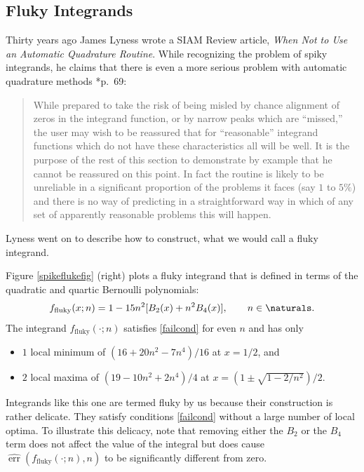 \documentclass[]{amsart}
\DeclareMathOperator{\err}{err}
\newcommand{\herr}{\widehat{\err}}
\theoremstyle{definition}
\theoremstyle{remark}
\begin{document}
\subsection{Fluky Integrands} 

Thirty years ago James Lyness wrote a SIAM Review article, \emph{When Not to Use an Automatic Quadrature Routine}.  While recognizing the problem of spiky integrands, he claims that there is even a more serious problem with automatic quadrature methods   \cite{Lyn83}*{p.\ 69}:
\begin{quote}
While prepared to take the risk of being misled by chance alignment of zeros in the integrand function, or by narrow peaks which are ``missed,'' the user may wish to be reassured that for ``reasonable'' integrand functions which do not have these characteristics all will be well. It is the purpose of the rest of this section to demonstrate by example that he cannot be reassured on this point. In fact the routine is likely to be unreliable in a significant proportion of the problems it faces (say $1$ to $5\%$) and there is no way of predicting in a straightforward way in which of any set of apparently reasonable problems this will happen.
\end{quote}
Lyness went on to describe how to construct, what we would call a fluky integrand.  

Figure \ref{spikeflukefig} (right) plots a fluky integrand that is defined in terms of the quadratic and quartic Bernoulli polynomials:
\begin{equation} \label{fluky}
f_{\text{fluky}}(x;n) = 1 - 15 n^2 [B_2(x) + n^2 B_4(x)], \qquad n \in \naturals.
\end{equation}
The integrand $f_{\text{fluky}}(\cdot;n)$ satisfies \eqref{failcond} for even $n$ and has only 
\begin{itemize}
\item $1$ local minimum of $(16 + 20 n^2 - 7 n^4)/16$ at $x=1/2$, and
\item $2$ local maxima of $(19 - 10 n^2 + 2 n^4)/4$ at $x=(1 \pm \sqrt{1 -2/n^2})/2$.
\end{itemize}
Integrands like this one are termed fluky by us because their construction is rather delicate.  They satisfy conditions \eqref{failcond} without a large number of local optima.  To illustrate this delicacy, note that removing either the $B_2$ or the $B_4$ term does not affect the value of the integral but does cause $\herr(f_{\text{fluky}}(\cdot;n),n)$ to be significantly different from zero.
\end{document}
